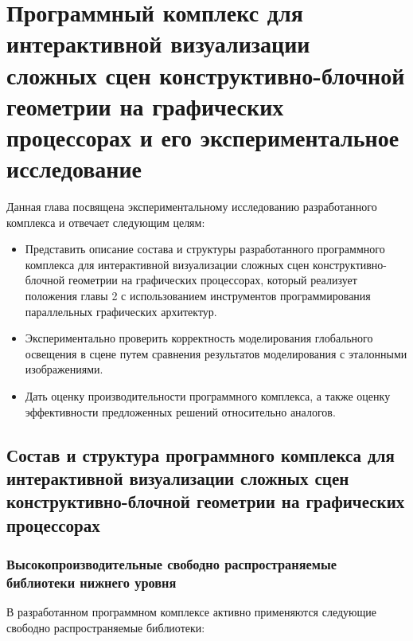 \chapter{Программный комплекс для интерактивной визуализации сложных сцен конструктивно-блочной геометрии на графических процессорах и его экспериментальное исследование} \label{chapt3}

Данная глава посвящена экспериментальному исследованию разработанного комплекса и отвечает следующим целям:
\begin{itemize}
  \item Представить описание состава и структуры разработанного программного комплекса для интерактивной визуализации сложных сцен конструктивно-блочной геометрии на графических процессорах, который реализует положения главы 2 с использованием инструментов программирования параллельных графических архитектур.

  \item Экспериментально проверить корректность моделирования глобального освещения в сцене путем сравнения результатов моделирования с эталонными изображениями.

  \item Дать оценку производительности программного комплекса, а также оценку эффективности предложенных решений относительно аналогов.
\end{itemize}

\section{Состав и структура программного комплекса для интерактивной визуализации сложных сцен конструктивно-блочной геометрии на графических процессорах}

\subsection{Высокопроизводительные свободно распространяемые библиотеки нижнего уровня}

В разработанном программном комплексе активно применяются следующие свободно распространяемые библиотеки:

